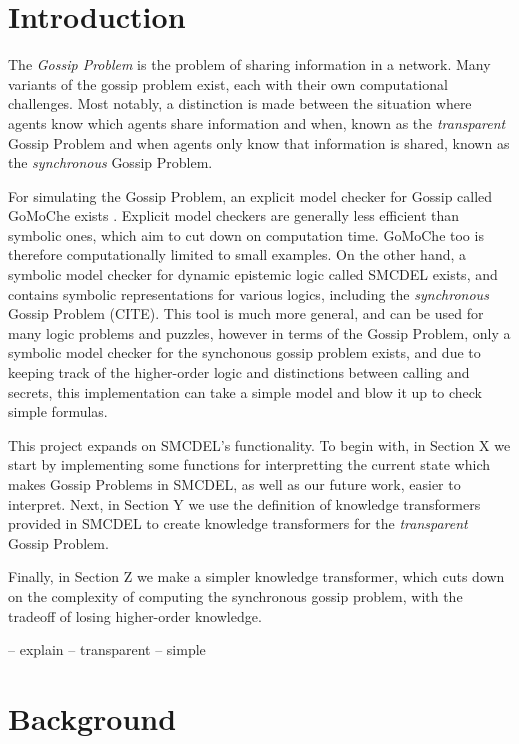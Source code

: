 \section{Introduction}

The \textit{Gossip Problem} is the problem of sharing information in a network.
Many variants of the gossip problem exist, each with their own computational challenges. 
Most notably, a distinction is made between the situation where agents know which agents share 
information and when, known as the \textit{transparent} Gossip Problem and when agents only know that 
information is shared, known as the \textit{synchronous} Gossip Problem.

For simulating the Gossip Problem, an explicit model checker for Gossip called GoMoChe exists \cite{gattinger2023gomoche}.
Explicit model checkers are generally less efficient than symbolic ones, which aim to cut down on computation time.
GoMoChe too is therefore computationally limited to small examples. On the other hand, a symbolic model checker for dynamic 
epistemic logic called SMCDEL exists, and contains symbolic representations for various logics, including the \textit{synchronous} Gossip Problem (CITE).
This tool is much more general, and can be used for many logic problems and puzzles, however in terms of the Gossip Problem, 
only a symbolic model checker for the synchonous gossip problem exists, and due to keeping track of the 
higher-order logic and distinctions between calling and secrets, this implementation can take a simple model and 
blow it up to check simple formulas. 

This project expands on SMCDEL's functionality. To begin with, in Section X we start by implementing
some functions for interpretting the current state which makes Gossip Problems in SMCDEL, as well as
our future work, easier to interpret. Next, in Section Y we use the definition of knowledge transformers provided in SMCDEL to create
knowledge transformers for the \textit{transparent} Gossip Problem. 

Finally, in Section Z we make a simpler knowledge transformer, which cuts down on the complexity of 
computing the synchronous gossip problem, with the tradeoff of losing higher-order knowledge.  

-- explain  
-- transparent
-- simple


\section{Background}
